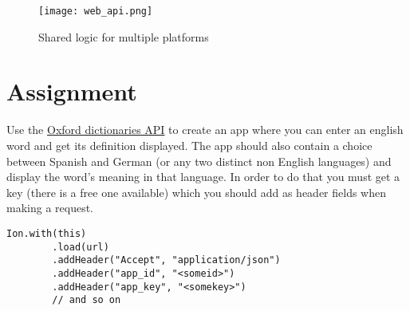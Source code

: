 \begin{figure}[H]
\centering
\texttt{[image: web\_api.png]}
\caption{Shared logic for multiple platforms}
\label{fig:logshare}
\end{figure}

\section{Assignment}
Use the \href{https://developer.oxforddictionaries.com}{Oxford dictionaries API} to create an app where you can enter an english word and get its definition displayed. The app should also contain a choice between Spanish and German (or any two distinct non English languages) and display the word's meaning in that language. In order to do that you must get a key (there is a free one available) which you should add as header fields when making a request.

\begin{lstlisting}[style=A_Java]
Ion.with(this)
        .load(url)
        .addHeader("Accept", "application/json")
        .addHeader("app_id", "<someid>")
        .addHeader("app_key", "<somekey>")
        // and so on
\end{lstlisting}